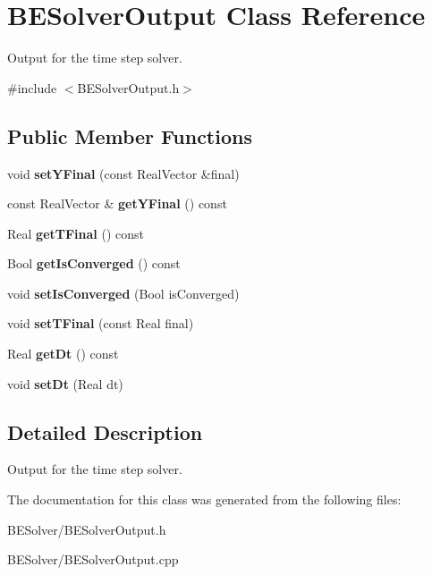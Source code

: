 \hypertarget{classBESolverOutput}{
\section{BESolverOutput Class Reference}
\label{classBESolverOutput}
}


Output for the time step solver.  


{\ttfamily \#include $<$BESolverOutput.h$>$}\subsection*{Public Member Functions}
\begin{DoxyCompactItemize}
\item 
\hypertarget{classBESolverOutput_af64510e72c2be3c1893dcf860cb2f59f}{
void {\bfseries setYFinal} (const RealVector \&final)}
\label{classBESolverOutput_af64510e72c2be3c1893dcf860cb2f59f}

\item 
\hypertarget{classBESolverOutput_a65170df7854de381abfeeda76476d6a3}{
const RealVector \& {\bfseries getYFinal} () const }
\label{classBESolverOutput_a65170df7854de381abfeeda76476d6a3}

\item 
\hypertarget{classBESolverOutput_ab010f2b70af2ddde1d932dcae2885abd}{
Real {\bfseries getTFinal} () const }
\label{classBESolverOutput_ab010f2b70af2ddde1d932dcae2885abd}

\item 
\hypertarget{classBESolverOutput_a2f0275ab6bc4dab947926375a45c7e07}{
Bool {\bfseries getIsConverged} () const }
\label{classBESolverOutput_a2f0275ab6bc4dab947926375a45c7e07}

\item 
\hypertarget{classBESolverOutput_a78b7246f32c4a733af2bb0e92c6d7f4c}{
void {\bfseries setIsConverged} (Bool isConverged)}
\label{classBESolverOutput_a78b7246f32c4a733af2bb0e92c6d7f4c}

\item 
\hypertarget{classBESolverOutput_ad6a51456e274386d290d8614aa42b835}{
void {\bfseries setTFinal} (const Real final)}
\label{classBESolverOutput_ad6a51456e274386d290d8614aa42b835}

\item 
\hypertarget{classBESolverOutput_afdafc1ea0c5363efa4ac203f4f6e9c8f}{
Real {\bfseries getDt} () const }
\label{classBESolverOutput_afdafc1ea0c5363efa4ac203f4f6e9c8f}

\item 
\hypertarget{classBESolverOutput_a7f1f43b10a953825a95475d99270626e}{
void {\bfseries setDt} (Real dt)}
\label{classBESolverOutput_a7f1f43b10a953825a95475d99270626e}

\end{DoxyCompactItemize}


\subsection{Detailed Description}
Output for the time step solver. 

The documentation for this class was generated from the following files:\begin{DoxyCompactItemize}
\item 
BESolver/BESolverOutput.h\item 
BESolver/BESolverOutput.cpp\end{DoxyCompactItemize}
